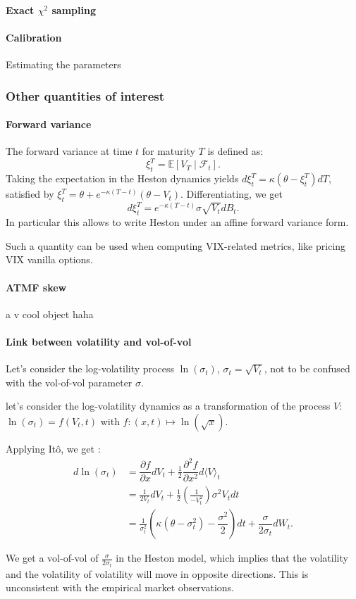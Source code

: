 \paragraph{Exact $\chi^2$ sampling}

\paragraph{Calibration} Estimating the parameters

\subsubsection*{Other quantities of interest}

\paragraph{Forward variance}

The forward variance at time $t$ for maturity $T$ is defined as:
\[ \xi_t^T = \mathbb{E}\left[V_T \mid \mathcal{F}_t \right]. \]
Taking the expectation in the Heston dynamics yields $d \xi_t^T = \kappa (\theta - \xi_t^T) dT$, satisfied by $\xi_t^T = \theta + e^{-\kappa (T-t)} (\theta - V_t)$.
\newline Differentiating, we get \[d \xi_t^T = e^{-\kappa (T-t)} \sigma \sqrt{V_t} dB_t.\] In particular this allows to write Heston under an affine forward variance form.

Such a quantity can be used when computing VIX-related metrics, like pricing VIX vanilla options.

\paragraph{ATMF skew}

a v cool object haha

\paragraph{Link between volatility and vol-of-vol}

Let's consider the log-volatility process $\ln(\sigma_t)$, $\sigma_t = \sqrt{V_t}$, not to be confused with the vol-of-vol parameter $\sigma$.

let's consider the log-volatility dynamics as a transformation of the process $V$: $\ln(\sigma_t) = f(V_t, t)$ with $f \colon (x,t) \mapsto \ln(\sqrt{x})$.

Applying It\^o, we get :
\begin{align*}
    d\ln(\sigma_t) &= \dfrac{\partial f}{\partial x} dV_t + \frac1{2}\dfrac{\partial^2 f}{\partial x^2} d\langle V \rangle_t\\
    &= \frac1{2V_t} dV_t + \frac1{2}\left(\frac1{-V_t^2}\right)\sigma^2 V_t dt\\
    &= \frac1{\sigma_t^2} \left(\kappa(\theta - \sigma_t^2) - \dfrac{\sigma^2}{2}\right) dt + \dfrac{\sigma}{2\sigma_t}dW_t.
\end{align*}

We get a vol-of-vol of $\frac{\sigma}{2\sigma_t}$ in the Heston model, which implies that the volatility and the volatility of volatility will move in opposite directions. This is unconsistent with the empirical market observations. 

